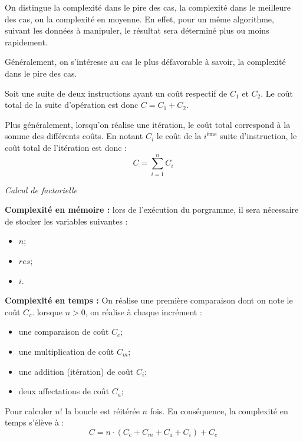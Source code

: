\documentclass[11pt,oneside]{article}
\begin{document}
\begin{rem}

On distingue la complexité dans le pire des cas, la complexité dans le meilleure des cas, ou la complexité en moyenne. En effet, pour un même algorithme, suivant les données à manipuler, le résultat sera déterminé plus ou moins rapidement. 

Généralement, on s'intéresse au cas le plus défavorable à savoir, la complexité dans le pire des cas. 
\end{rem}

\begin{resultat}
Soit une suite de deux instructions ayant un coût respectif de $C_1$ et $C_2$. Le coût total de la suite d'opération est donc $C=C_1 + C_2$.

Plus généralement, lorsqu'on réalise une itération, le coût total correspond à la somme des différents coûts. En notant $C_i$ le coût de la $i^{\text{ème}}$ suite d'instruction, le coût total de l'itération est donc :
$$
C = \sum\limits_{i=1}^{n}C_i
$$
\end{resultat}

\begin{exemple}
\textit{Calcul de factorielle}

\begin{pseudo}
\begin{algorithm}[H]
\end{algorithm}
\end{pseudo}

\textbf{Complexité en mémoire :} lors de l'exécution du porgramme, il sera nécessaire de stocker les variables suivantes : 
\begin{itemize}
\item $n$;
\item $res$;
\item $i$. 
\end{itemize}

\textbf{Complexité en temps :}
On réalise une première comparaison dont on note le coût $C_c$.
 lorsque $n>0$, on réalise à chaque incrément : 
\begin{itemize}
\item une comparaison de coût $C_c$;
\item une multiplication de coût $C_m$;
\item une addition (itération) de coût $C_i$;
\item deux affectations de coût $C_a$;
\end{itemize}
Pour calculer $n!$ la boucle est réitérée $n$ fois. En conséquence, la complexité en temps s'élève à :
$$C = n\cdot(C_c+C_m+C_a+C_i)+C_c$$
\end{exemple}
\end{document}
